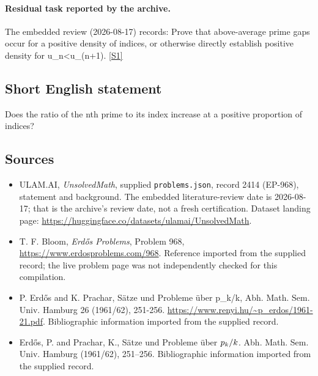 \documentclass[11pt,a4paper]{article}
\newcommand{\sref}[2]{\hyperlink{source:#1:#2}{[S#2]}}
\begin{document}
\paragraph{Residual task reported by the archive.}

The embedded review (2026-08-17) records: Prove that above-average prime gaps occur for a positive density of indices, or otherwise directly establish positive density for u\_n<u\_(n+1). \sref{2414}{1}

\subsection{Short English statement}

Does the ratio of the nth prime to its index increase at a positive proportion of indices?

\subsection{Sources}

{\small

\begin{itemize}

\item[\hypertarget{source:2414:1}{S1}] ULAM.AI, \emph{UnsolvedMath}, supplied \texttt{problems.json}, record 2414 (EP-968), statement and background. The embedded literature-review date is 2026-08-17; that is the archive’s review date, not a fresh certification. Dataset landing page: \url{https://huggingface.co/datasets/ulamai/UnsolvedMath}.

\item[\hypertarget{source:2414:2}{S2}] T. F. Bloom, \emph{Erdős Problems}, Problem 968, \url{https://www.erdosproblems.com/968}. Reference imported from the supplied record; the live problem page was not independently checked for this compilation.

\item[\hypertarget{source:2414:3}{S3}] P. Erdős and K. Prachar, Sätze und Probleme über p\_k/k, Abh. Math. Sem. Univ. Hamburg 26 (1961/62), 251-256. \url{https://www.renyi.hu/~p_erdos/1961-21.pdf}. Bibliographic information imported from the supplied record.

\item[\hypertarget{source:2414:4}{S4}] Erd\H{o}s, P. and Prachar, K., S\"{a}tze und {P}robleme \"{u}ber {$p\sb{k}/k$}. Abh. Math. Sem. Univ. Hamburg (1961/62), 251--256. Bibliographic information imported from the supplied record.

\end{itemize}

}

\label{end:2414}
\end{document}
